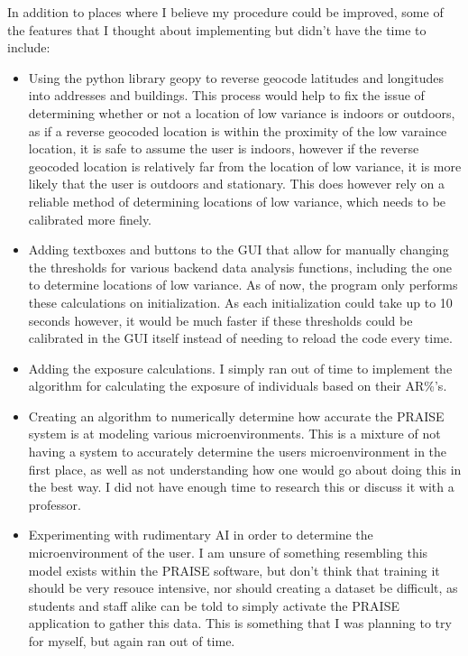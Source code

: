 \documentclass{article}
\begin{document}
\begin{multicols}{2}
In addition to places where I believe my procedure could be improved, some of the features 
that I thought about implementing but didn't have the time to include:
\begin{itemize}
  \item Using the python library geopy to reverse geocode latitudes and longitudes into 
  addresses and buildings. This process would help to fix the issue of determining whether
  or not a location of low variance is indoors or outdoors, as if a reverse geocoded 
  location is within the proximity of the low varaince location, it is safe to assume the 
  user is indoors, however if the reverse geocoded location is relatively far from 
  the location of low variance, it is more likely that the user is outdoors and stationary.
  This does however rely on a reliable method of determining locations of low variance, 
  which needs to be calibrated more finely.
  \item Adding textboxes and buttons to the GUI that allow for manually changing the 
  thresholds for various backend data analysis functions, including the one to determine 
  locations of low variance. As of now, the program only performs these calculations on 
  initialization. As each initialization could take up to 10 seconds however, it would be 
  much faster if these thresholds could be calibrated in the GUI itself instead of needing
  to reload the code every time.
  \item Adding the exposure calculations. I simply ran out of time to implement the 
  algorithm for calculating the exposure of individuals based on their AR\%'s. 
  \item Creating an algorithm to numerically determine how accurate the PRAISE system
  is at modeling various microenvironments. This is a mixture of not having a system to 
  accurately determine the users microenvironment in the first place, as well as not 
  understanding how one would go about doing this in the best way. I did not have enough 
  time to research this or discuss it with a professor.
  \item Experimenting with rudimentary AI in order to determine the microenvironment of the
  user. I am unsure of something resembling this model exists within the PRAISE software, 
  but don't think that training it should be very resouce intensive, nor should creating 
  a dataset be difficult, as students and staff alike can be told to simply activate the 
  PRAISE application to gather this data. This is something that I was planning to try for 
  myself, but again ran out of time.
\end{itemize}


\end{multicols}
\end{document}
